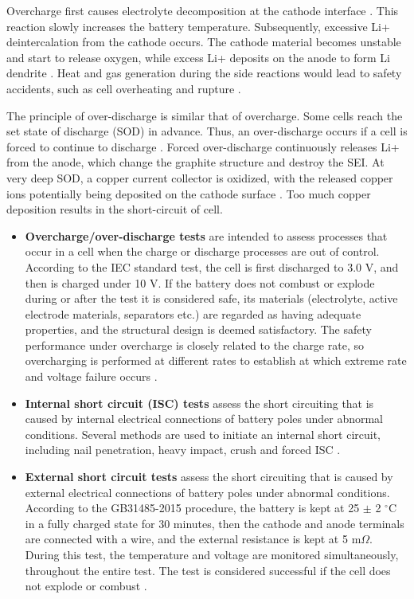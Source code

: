 Overcharge first causes electrolyte decomposition at the cathode interface \cite{ohsaki2005overcharge}. This reaction slowly increases the battery temperature. Subsequently, excessive Li+ deintercalation from the cathode occurs. The cathode material becomes unstable and start to release oxygen, while excess Li+ deposits on the anode to form Li dendrite \cite{arai2015situ}. Heat and gas generation during the side reactions would lead to safety accidents, such as cell overheating and rupture \cite{lisbona2011review}.

The principle of over-discharge is similar that of overcharge. Some cells reach the set state of discharge (SOD) in advance. Thus, an over-discharge occurs if a cell is forced to continue to discharge \cite{li2008effect}. Forced over-discharge continuously releases Li+ from the anode, which change the graphite structure and destroy the SEI. At very deep SOD, a copper current collector is oxidized, with the released copper ions potentially being deposited on the cathode surface \cite{ouyang2018investigation}. Too much copper deposition results in the short-circuit of cell.

\begin{itemize}
    \item \textbf{Overcharge/over-discharge tests} are intended to assess processes that occur in a cell when the charge or discharge processes are out of control. According to the IEC standard test, the cell is first discharged to 3.0 V, and then is charged under 10 V. If the battery does not combust or explode during or after the test it is considered safe, its materials (electrolyte, active electrode materials, separators etc.) are regarded as having adequate properties, and the structural design is deemed satisfactory. The safety performance under overcharge is closely related to the charge rate, so overcharging is performed at different rates to establish at which extreme rate and voltage failure occurs \cite{chen2021review}.
    \item \textbf{Internal short circuit (ISC) tests} assess the short circuiting that is caused by internal electrical connections of battery poles under abnormal conditions. Several methods are used to initiate an internal short circuit, including nail penetration, heavy impact, crush and forced ISC \cite{chen2021review}. 
    \item \textbf{External short circuit tests} assess the short circuiting that is caused by external electrical connections of battery poles under abnormal conditions. According to the GB31485-2015 procedure, the battery is kept at 25 $\pm$ 2 $^\circ$C in a fully charged state for 30 minutes, then the cathode and anode terminals are connected with a wire, and the external resistance is kept at 5 m$\Omega$. During this test, the temperature and voltage are monitored simultaneously, throughout the entire test. The test is considered successful if the cell does not explode or combust \cite{chen2021review}.
\end{itemize}

